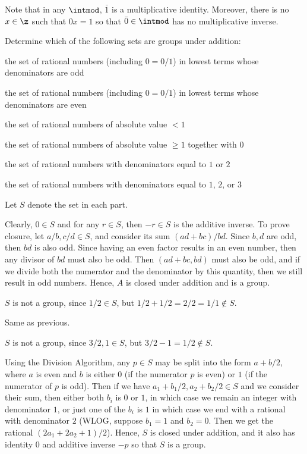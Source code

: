 \begin{problems}
\begin{sol}
        Note that in any $\intmod$, $\bar 1$ is a multiplicative identity. Moreover, there is no $x \in \z$ such that $0x = 1$ so that $\bar 0 \in \intmod$ has no multiplicative inverse.  
    \end{sol}
    \item Determine which of the following sets are groups under addition:
    \begin{problems}
        \item the set of rational numbers (including $0 = 0/1$) in lowest terms whose denominators are odd
        \item the set of rational numbers (including $0 = 0/1$) in lowest terms whose denominators are even
        \item the set of rational numbers of absolute value $< 1$
        \item the set of rational numbers of absolute value $\ge 1$ together with $0$
        \item the set of rational numbers with denominators equal to $1$ or $2$
        \item the set of rational numbers with denominators equal to $1$, $2$, or $3$
    \end{problems}
    \begin{sol}
        Let $S$ denote the set in each part.
        \begin{problems}
            \item Clearly, $0 \in S$ and for any $r \in S$, then $-r \in S$ is the additive inverse. To prove closure, let $a/b, c/d \in S$, and consider its sum $(ad + bc)/bd$. Since $b, d$ are odd, then $bd$ is also odd. Since having an even factor results in an even number, then any divisor of $bd$ must also be odd. Then $(ad + bc, bd)$ must also be odd, and if we divide both the numerator and the denominator by this quantity, then we still result in odd numbers. Hence, $A$ is closed under addition and is a group. 
            \item $S$ is not a group, since $1/2 \in S$, but $1/2 + 1/2 = 2/2 = 1/1 \not\in S$.
            \item Same as previous.
            \item $S$ is not a group, since $3/2, 1 \in S$, but $3/2-1 = 1/2 \not\in S$.
            \item Using the Division Algorithm, any $p \in S$ may be split into the form $a + b/2$, where $a$ is even and $b$ is either $0$ (if the numerator $p$ is even) or $1$ (if the numerator of $p$ is odd). Then if we have $a_1 + b_1/2, a_2 + b_2/2 \in S$ and we consider their sum, then either both $b_i$ is $0$ or $1$, in which case we remain an integer with denominator $1$, or just one of the $b_i$ is $1$ in which case we end with a rational with denominator $2$ (WLOG, suppose $b_1 = 1$ and $b_2 = 0$. Then we get the rational $(2a_1 + 2a_2 + 1)/2$). Hence, $S$ is closed under addition, and it also has identity $0$ and additive inverse $-p$ so that $S$ is a group.

\end{problems}
\end{sol}
\end{problems}
